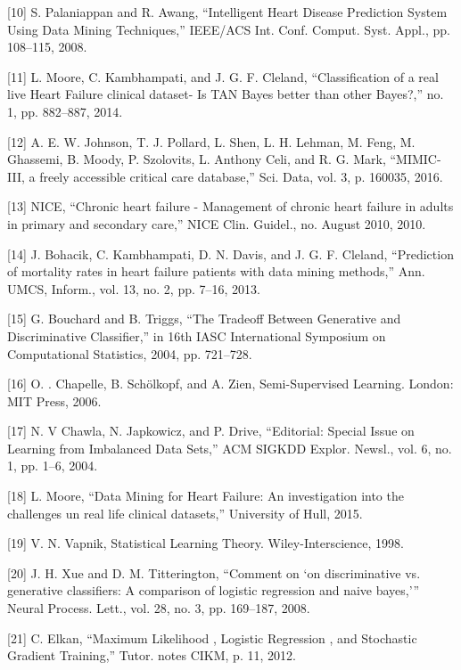 \documentclass[a4paper,UKenglish]{oasics-v2016}
\begin{document}
[10]	S. Palaniappan and R. Awang, “Intelligent Heart Disease Prediction System Using Data Mining Techniques,” IEEE/ACS Int. Conf. Comput. Syst. Appl., pp. 108–115, 2008.

[11]	L. Moore, C. Kambhampati, and J. G. F. Cleland, “Classification of a real live Heart Failure clinical dataset- Is TAN Bayes better than other Bayes?,” no. 1, pp. 882–887, 2014.

[12]	A. E. W. Johnson, T. J. Pollard, L. Shen, L. H. Lehman, M. Feng, M. Ghassemi, B. Moody, P. Szolovits, L. Anthony Celi, and R. G. Mark, “MIMIC-III, a freely accessible critical care database,” Sci. Data, vol. 3, p. 160035, 2016.

[13]	NICE, “Chronic heart failure - Management of chronic heart failure in adults in primary and secondary care,” NICE Clin. Guidel., no. August 2010, 2010.

[14]	J. Bohacik, C. Kambhampati, D. N. Davis, and J. G. F. Cleland, “Prediction of mortality rates in heart failure patients with data mining methods,” Ann. UMCS, Inform., vol. 13, no. 2, pp. 7–16, 2013.

[15]	G. Bouchard and B. Triggs, “The Tradeoff Between Generative and Discriminative Classifier,” in 16th IASC International Symposium on Computational Statistics, 2004, pp. 721–728.

[16]	O. . Chapelle, B. Schölkopf, and A. Zien, Semi-Supervised Learning. London: MIT Press, 2006.

[17]	N. V Chawla, N. Japkowicz, and P. Drive, “Editorial: Special Issue on Learning from Imbalanced Data Sets,” ACM SIGKDD Explor. Newsl., vol. 6, no. 1, pp. 1–6, 2004.

[18]	L. Moore, “Data Mining for Heart Failure: An investigation into the challenges un real life clinical datasets,” University of Hull, 2015.

[19]	V. N. Vapnik, Statistical Learning Theory. Wiley-Interscience, 1998.

[20]	J. H. Xue and D. M. Titterington, “Comment on ‘on discriminative vs. generative classifiers: A comparison of logistic regression and naive bayes,’” Neural Process. Lett., vol. 28, no. 3, pp. 169–187, 2008.

[21]	C. Elkan, “Maximum Likelihood , Logistic Regression , and Stochastic Gradient Training,” Tutor. notes CIKM, p. 11, 2012.
\end{document}
